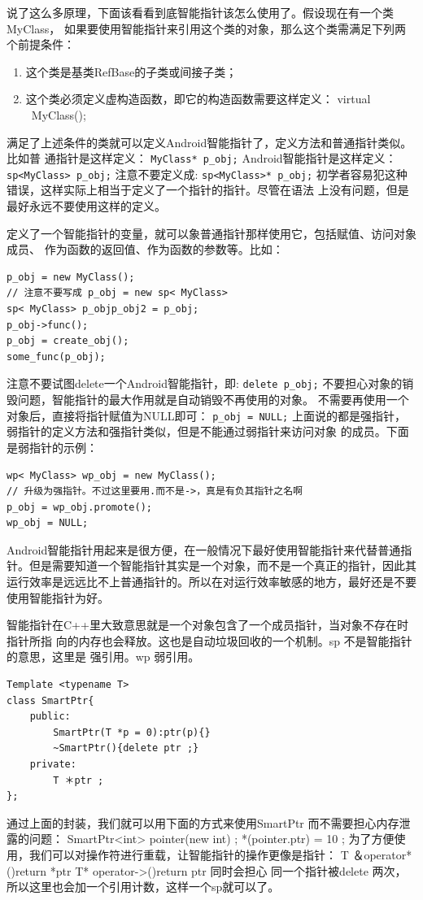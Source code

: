 \documentclass[a4paper,11pt]{article}
\begin{document}
说了这么多原理，下面该看看到底智能指针该怎么使用了。假设现在有一个类MyClass，
如果要使用智能指针来引用这个类的对象，那么这个类需满足下列两个前提条件：
\begin{enumerate}
    \item 这个类是基类RefBase的子类或间接子类；
    \item 这个类必须定义虚构造函数，即它的构造函数需要这样定义：
virtual ~MyClass(); 
\end{enumerate} 
满足了上述条件的类就可以定义Android智能指针了，定义方法和普通指针类似。比如普
通指针是这样定义：
\lstinline{MyClass* p_obj;}
Android智能指针是这样定义：
\lstinline{sp<MyClass> p_obj;}
注意不要定义成:
\lstinline{sp<MyClass>* p_obj;}
初学者容易犯这种错误，这样实际上相当于定义了一个指针的指针。尽管在语法
上没有问题，但是最好永远不要使用这样的定义。

定义了一个智能指针的变量，就可以象普通指针那样使用它，包括赋值、访问对象成员、
作为函数的返回值、作为函数的参数等。比如：
\begin{lstlisting}
p_obj = new MyClass();   
// 注意不要写成 p_obj = new sp< MyClass> 
sp< MyClass> p_objp_obj2 = p_obj;  
p_obj->func();  
p_obj = create_obj();  
some_func(p_obj); 
\end{lstlisting}
注意不要试图delete一个Android智能指针，即:
\lstinline|delete p_obj;|
不要担心对象的销毁问题，智能指针的最大作用就是自动销毁不再使用的对象。
不需要再使用一个对象后，直接将指针赋值为NULL即可：
\lstinline|p_obj = NULL;|
上面说的都是强指针，弱指针的定义方法和强指针类似，但是不能通过弱指针来访问对象
的成员。下面是弱指针的示例：
\begin{lstlisting}
wp< MyClass> wp_obj = new MyClass();  
// 升级为强指针。不过这里要用.而不是->，真是有负其指针之名啊  
p_obj = wp_obj.promote();   
wp_obj = NULL; 
\end{lstlisting}

Android智能指针用起来是很方便，在一般情况下最好使用智能指针来代替普通指针。但是需要知道一个智能指针其实是一个对象，而不是一个真正的指针，因此其运行效率是远远比不上普通指针的。所以在对运行效率敏感的地方，最好还是不要使用智能指针为好。

智能指针在C++里大致意思就是一个对象包含了一个成员指针，当对象不存在时指针所指
向的内存也会释放。这也是自动垃圾回收的一个机制。sp 不是智能指针的意思，这里是
强引用。wp 弱引用。

\begin{lstlisting}
Template <typename T>
class SmartPtr{
    public:
        SmartPtr(T *p = 0):ptr(p){}
        ~SmartPtr(){delete ptr ;}
    private:
        T ＊ptr ;
};
\end{lstlisting}
通过上面的封装，我们就可以用下面的方式来使用SmartPtr 而不需要担心内存泄露的问题：
SmartPtr<int> pointer(new int) ;
*(pointer.ptr) = 10 ;
为了方便使用，我们可以对操作符进行重载，让智能指针的操作更像是指针：
T ＆operator*(){return *ptr}
T* operator->(){return ptr}
同时会担心 同一个指针被delete 两次，所以这里也会加一个引用计数，这样一个sp就可以了。
\end{document}
